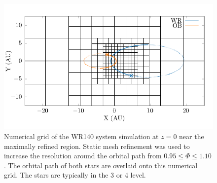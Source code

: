 
\begin{figure}
  \centering
  \includegraphics{assets/wr140-grid/grid-orbit.pdf}
  \caption[Numerical grid of the WR140 system simulation at $z=0$]{Numerical grid of the WR140 system simulation at $z=0$ near the maximally refined region. Static mesh refinement was used to increase the resolution around the orbital path from $0.95 \leq \Phi \leq 1.10$. The orbital path of both stars are overlaid onto this numerical grid. The stars are typically in the 3 or 4 level.}
  \label{fig:p2-orbitalpath}
\end{figure}


